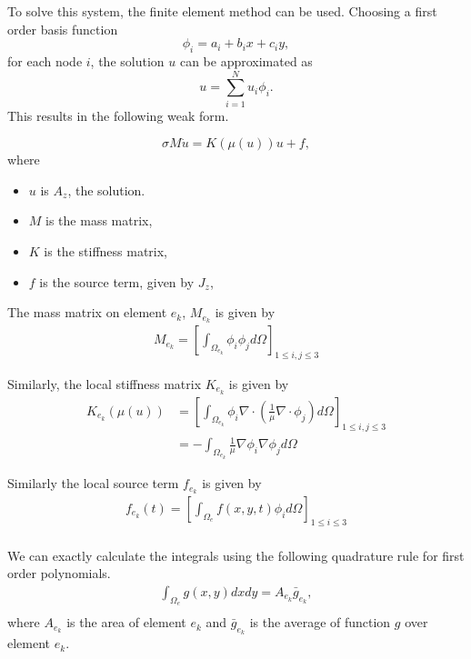 To solve this system, the finite element method can be used. Choosing a first order basis function 
\[
    \phi_i = a_i + b_i x + c_i y,
\]
for each node $i$, the solution $u$ can be approximated as
\[
    u = \sum_{i=1}^N u_i \phi_i.
\]
This results in the following weak form.
\begin{weakform}
    \begin{equation}
        \sigma M \dot u = K(\mu(u)) u + f,
        \label{eqn:weakform}
    \end{equation}
    where
    \begin{itemize}
        \item $u$ is $A_z$, the solution.
        \item $M$ is the mass matrix,
        \item $K$ is the stiffness matrix,
        \item $f$ is the source term, given by $J_z$,
    \end{itemize}
\end{weakform}

\noindent The mass matrix on element $e_k$,  $M_{e_k}$ is given by
\begin{align*}
    M_{e_k} = \left[\int_{\Omega_{e_k}}\phi_i\phi_j d\Omega \right]_{1 \leq i, j \leq 3}
\end{align*}

\noindent Similarly, the local stiffness matrix $K_{e_k}$ is given by
\begin{align*}
    K_{e_k}(\mu(u)) &= \left[\int_{\Omega_{e_k}} \phi_i \nabla \cdot \left(\frac{1}{\mu} \nabla \cdot \phi_j \right) d \Omega \right]_{1 \leq i, j \leq 3} \\
    &= -\int_{\Omega_{e_k}} \frac{1}{\mu} \nabla \phi_i \nabla \phi_j d \Omega
\end{align*}

\noindent Similarly the local source term $f_{e_k}$ is given by
\begin{align*}
    f_{e_k}(t) = \left[\int_{\Omega_e} f(x,y,t) \phi_i d \Omega\right]_{1 \leq i \leq 3}\\
\end{align*}

\noindent We can exactly calculate the integrals using the following quadrature rule for first order polynomials.
\begin{align*}
    \int_{\Omega_e}g(x,y)dxdy = A_{e_k}\bar{g}_{e_k}, \\
\end{align*}
where $A_{e_k}$ is the area of element $e_k$ and $\bar{g}_{e_k}$ is the average of function $g$ over element $e_k$.

